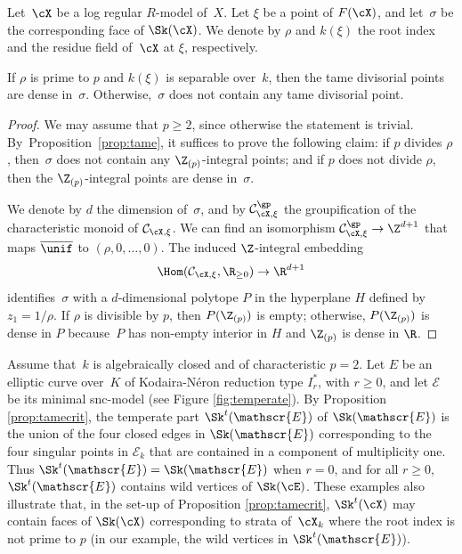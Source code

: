 \begin{prop}\label{prop:tamecrit}
Let~$\cX$ be a log regular $R$\nobreakdash-model of~$X$. Let $\xi$ be a point of $F(\cX)$, and let~$\sigma$ be the corresponding face of
$\Sk(\cX)$. We denote by $\rho$ and $k(\xi)$ the root index and the residue field of~$\cX$ at $\xi$, respectively.

If $\rho$ is prime to $p$ and $k(\xi)$ is separable over~$k$, then the tame divisorial points are dense in~$\sigma$. Otherwise,~$\sigma$ does not contain any tame divisorial point.
\end{prop}
\begin{proof}
We may assume that $p\geq 2$, since otherwise the statement is trivial.
By~Pro\-position~\ref{prop:tame}, it suffices to prove the following claim: if $p$ divides $\rho$, then~$\sigma$ does not contain any $\Z_{(p)}$-integral points; and if $p$ does not divide $\rho$, then the $\Z_{(p)}$-integral points are dense in~$\sigma$.

We denote by $d$ the dimension of~$\sigma$, and by
$\mathcal{C}^{\gp}_{\cX,\xi}$ the groupification of the characteristic monoid of $\mathcal{C}_{\cX,\xi}$.
We can find an isomorphism $\mathcal{C}^{\gp}_{\cX,\xi}\to \Z^{d+1}$ that maps
$\overline{\unif}$ to $(\rho,0,\ldots,0)$. The induced $\Z$-integral embedding
\[
\Hom(\mathcal{C}_{\cX,\xi}, \R_{\geq 0}) \to \R^{d+1}
\]
identifies~$\sigma$
with a $d$-dimensional polytope $P$ in the hyperplane $H$ defined by $z_1=1/\rho$.
If $\rho$ is divisible by $p$, then $P(\Z_{(p)})$ is empty; otherwise, $P(\Z_{(p)})$ is dense in $P$
because~$P$ has non-empty interior in $H$ and $\Z_{(p)}$ is dense in $\R$.
\end{proof}

\begin{example}\label{exam:temperate}
Assume that~$k$ is algebraically closed and of characteristic $p=2$. Let $E$ be an elliptic curve over~$K$ of Kodaira-Néron reduction type $I^{\ast}_r$, with $r\geq 0$, and let $\mathscr{E}$ be its minimal snc-model (see Figure \ref{fig:temperate}). By Proposition \ref{prop:tamecrit}, the temperate part $\Sk^t(\mathscr{E})$ of $\Sk(\mathscr{E})$ is the union of the four closed edges in $\Sk(\mathscr{E})$ corresponding to the four singular points in $\mathscr{E}_{k}$ that are contained in a component of multiplicity one.
Thus $\Sk^t(\mathscr{E})=\Sk(\mathscr{E})$ when $r=0$, and for all $r\geq 0$,
$\Sk^t(\mathscr{E})$ contains wild vertices of $\Sk(\cE)$. These examples also illustrate that, in the set-up of Proposition \ref{prop:tamecrit},
$\Sk^t(\cX)$ may contain faces of $\Sk(\cX)$ corresponding to strata of~$\cX_k$ where the root index is not prime to $p$ (in our example, the wild vertices in $\Sk^t(\mathscr{E})$).
\end{example}

